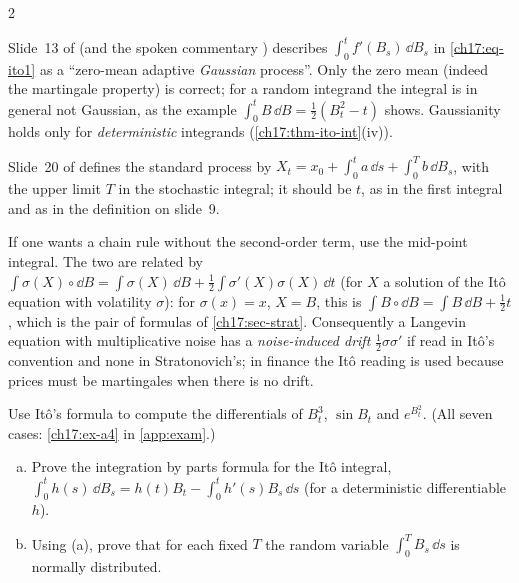 \begin{paracol}{2}
\begin{coursenote}
Slide~13 of  (and the spoken commentary ) describes $\int_0^tf'(B_s)\,\dd B_s$ in \eqref{ch17:eq-ito1} as a ``zero-mean adaptive \emph{Gaussian} process''. Only the zero mean
(indeed the martingale property) is correct; for a random integrand the integral is in general not Gaussian, as the
example $\int_0^tB\,\dd B=\tfrac12(B_t^2-t)$ shows. Gaussianity holds only for \emph{deterministic} integrands (\cref{ch17:thm-ito-int}(iv)).
\end{coursenote}

\begin{coursenote}
Slide~20 of  defines the standard process by $X_t=x_0+\int_0^ta\,\dd s+\int_0^Tb\,\dd B_s$, with the upper limit $T$ in the stochastic integral; it should be $t$, as in the first integral and as in the definition on slide~9.
\end{coursenote}

\begin{remark}\label{ch17:rem-strat}
If one wants a chain rule without the second-order term, use the mid-point integral. The two are related by
$\int\sigma(X)\circ\dd B=\int\sigma(X)\,\dd B+\tfrac12\int\sigma'(X)\sigma(X)\,\dd t$ (for $X$ a solution of the It\^o equation with volatility $\sigma$): for $\sigma(x)=x$, $X=B$, this is $\int B\circ\dd B=\int B\,\dd B+\tfrac12t$,
which is the pair of formulas of \cref{ch17:sec-strat}. Consequently a Langevin equation with multiplicative noise has a \emph{noise-induced drift} $\tfrac12\sigma\sigma'$ if read in It\^o's convention and none in Stratonovich's;
in finance the It\^o reading is used because prices must be martingales when there is no drift.
\end{remark}

\begin{exercise}\label{ch17:ex-a4-short}
Use It\^o's formula to compute the differentials of $B_t^3$, $\sin B_t$ and $e^{B_t^2}$. (All seven cases: \cref{ch17:ex-a4} in \cref{app:exam}.)
\end{exercise}

\begin{exercise}\label{ch17:ex-b3}
\leavevmode
\begin{enumerate}[(a)]
  \item Prove the integration by parts formula for the It\^o integral, $\int_0^th(s)\,\dd B_s=h(t)B_t-\int_0^th'(s)B_s\,\dd s$ (for a deterministic differentiable $h$).
  \item Using (a), prove that for each fixed $T$ the random variable $\int_0^TB_s\,\dd s$ is normally distributed.
\end{enumerate}
\end{exercise}


\end{paracol}
